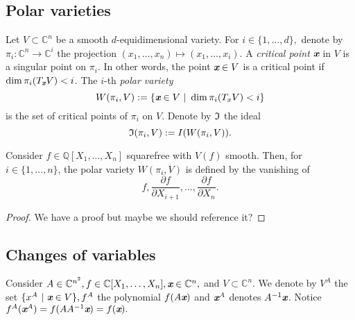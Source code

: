 \documentclass[sigconf]{acmart}
\def\xb{\textit{\textbf{x}}}
\def\C{\mathbb{C}}
\def\pa{\partial}
\def\I{\frak{I}}
\begin{document}
\subsection{Polar varieties}
%
Let $V\subset \C^n$ be a smooth $d$-equidimensional variety. For $i \in \{1,\hdots,d\},$ denote by $\pi_i:\C^n \rightarrow \C^i$ the projection
$(x_1,\hdots,x_n) \mapsto  (x_1,\hdots,x_i)$. A \textit{critical point} $\textit{\textbf{x}}$ in $V$ is a singular point on $\pi_i.$ In other words, the point $\textit{\textbf{x}} \in V$ is a critical point if $\dim \pi_i( T_\textit{\textbf{x}}V) < i$. The $i$-th  \textit{polar variety} \[W(\pi_i,V) := \{\textit{\textbf{x}} \in V~|~\dim \pi_i(T_xV) < i\}\] is the set of critical points of $\pi_i$ on $V$. Denote by $\I$ the ideal \[\frak{I}(\pi_i,V) := I(W(\pi_i,V)).\] 
%
\begin{proposition} 
Consider $f \in \mathbb{Q}[X_1,\hdots,X_n]$ squarefree with $V(f)$ smooth. Then, for $i \in \{1,\hdots,n\}$, the polar variety $W(\pi_i,V)$ is defined by the vanishing of \[f,\frac{\pa f}{\pa X_{i+1}},\hdots,\frac{\pa f}{\pa X_n}.\]
\end{proposition}
%
\begin{proof}
We have a proof but maybe we should reference it?
\end{proof}
%
\subsection{Changes of variables}
%
Consider $A \in \C^{n^2}, f \in \C[X_1,\hdots,X_n], \textit{\textbf{x}} \in \mathbb{C}^n,$ and $V \subset \C^n$. We denote by 
$V^A$ the set $\{x^A~|~\xb \in V\}, f^A$ the polynomial $f(A \xb)$ and $\xb^A$ denotes $A^{-1}\xb$. Notice $f^A(\xb^A) = f(A A^{-1}\xb)=f(\xb).$
%
%
%
%
%
%
%
%
\end{document}
